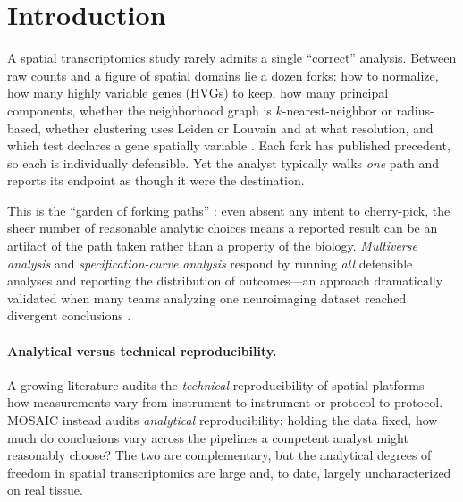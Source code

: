 
\section{Introduction}
A spatial transcriptomics study rarely admits a single ``correct'' analysis. Between raw
counts and a figure of spatial domains lie a dozen forks: how to normalize, how many
highly variable genes (HVGs) to keep, how many principal components, whether the
neighborhood graph is $k$-nearest-neighbor or radius-based, whether clustering uses Leiden
\citep{traag2019louvain} or Louvain \citep{blondel2008fast} and at what resolution, and
which test declares a gene spatially variable \citep{moran1950notes, svensson2018spatialde,
weber2023nnsvg}. Each fork has published precedent, so each is individually defensible. Yet
the analyst typically walks \emph{one} path and reports its endpoint as though it were the
destination.

This is the ``garden of forking paths'' \citep{gelman2013garden}: even absent any intent to
cherry-pick, the sheer number of reasonable analytic choices means a reported result can be
an artifact of the path taken rather than a property of the biology. \emph{Multiverse
analysis} \citep{steegen2016increasing} and \emph{specification-curve analysis}
\citep{simonsohn2020specification} respond by running \emph{all} defensible analyses and
reporting the distribution of outcomes---an approach dramatically validated when many teams
analyzing one neuroimaging dataset reached divergent conclusions
\citep{botvinik2020variability}.

\paragraph{Analytical versus technical reproducibility.} A growing literature audits the
\emph{technical} reproducibility of spatial platforms---how measurements vary from
instrument to instrument or protocol to protocol. MOSAIC instead audits \emph{analytical}
reproducibility: holding the data fixed, how much do conclusions vary across the pipelines a
competent analyst might reasonably choose? The two are complementary, but the analytical
degrees of freedom in spatial transcriptomics are large and, to date, largely
uncharacterized on real tissue.

